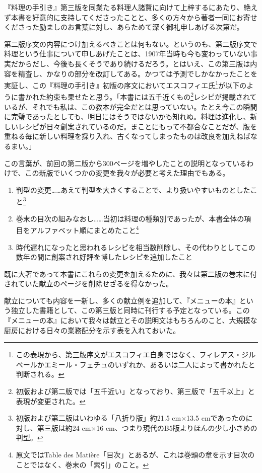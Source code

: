 『料理の手引き』第三版を同業たる料理人諸賢に向けて上梓するにあたり、絶えず本書を好意的に支持してくださったことと、多くの方々から著者一同にお寄せくださった励ましのお言葉に対し、あらためて深く御礼申しあげる次第だ。

第二版序文の内容につけ加えるべきことは何もない。というのも、第二版序文で料理という仕事について申しあげたことは、1907年当時も今も変わっていない事実だからだし、今後も長くそうであり続けるだろう。とはいえ、この第三版は内容を精査し、かなりの部分を改訂してある。かつては予測でしかなかったことを実証し、この『料理の手引き』初版の序文においてエスコフィエ氏\footnote{この表現から、第三版序文がエスコフィエ自身ではなく、フィレアス・ジルベールかエミール・フェチュのいずれか、あるいは二人によって書かれたと判断される。}が以下のように書かれた約束も果せたと思う。「本書には五千近くもの\footnote{初版および第二版では「五千近い」となっており、第三版で「五千以上」と表現が変更された。}レシピが掲載されているが、それでも私は、この教本が完全だとは思っていない。たとえ今この瞬間に完璧であったとしても、明日にはそうではないかも知れぬ。料理は進化し、新しいレシピが日々創案されているのだ。まことにもって不都合なことだが、版を重ねる毎に新しい料理を採り入れ、古くなってしまったものは改良を加えねばなるまい。」

この言葉が、前回の第二版から300ページを増やしたことの説明となっているわけで、この新版でいくつかの変更を我々が必要と考えた理由でもある。

\begin{enumerate}
\def\labelenumi{\arabic{enumi}.}
\item
  判型の変更\ldots{}\ldots{}あえて判型を大きくすることで、より扱いやすいものとしたこと\footnote{初版および第二版はいわゆる「八折り版」約21.5
    cm×13.5 cmであったのに対し、第三版は約24 cm×16
    cm、つまり現代のB5版よりほんの少し小さめの判型。}
\item
  巻末の目次の組みなおし\ldots{}\ldots{}当初は料理の種類別であったが、本書全体の項目をアルファベット順にまとめたこと\footnote{原文ではTable
    des
    Matière「目次」とあるが、これは巻頭の章を示す目次のことではなく、巻末の「索引」のこと。}
\item
  時代遅れになったと思われるレシピを相当数削除し、その代わりとしてこの数年の間に創案され好評を博したレシピを追加したこと
\end{enumerate}

既に大著であって本書にこれらの変更を加えるために、我々は第二版の巻末に付されていた献立のページを削除せざるを得なかった。

献立についても内容を一新し、多くの献立例を追加して、『メニューの本』という独立した書籍として、この第三版と同時に刊行する予定となっている。この『メニューの本』において我々は献立とその説明文はもちろんのこと、大規模な厨房における日々の業務配分を示す表を入れておいた。


